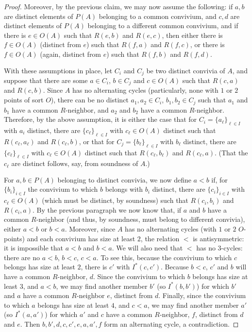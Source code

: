 \documentclass[10pt,a4paper]{amsart}
\begin{document}
\begin{proof}
Moreover, by the previous claim, we may now assume the following: if $a, b$ are distinct elements of $P(A)$ belonging to a common convivium, and $c, d$ are distinct elements of $P(A)$ belonging to a different common convivium, and if there is $e \in O(A) $ such that $R(e, b)$ and $R(e, c)$, then either there is $f \in O(A)$ (distinct from $e$) such that $R(f, a)$ and $R(f, c)$, or there is $f\in O(A)$ (again, distinct from $e$) such that $R(f, b)$ and $R(f, d)$.

With these assumptions in place, let $C_i$ and $C_j$ be two distinct convivia of $A$, and suppose that there are some $a \in C_i$, $b \in C_j$ and  $c \in O(A)$ such that $R(c, a)$ and $R(c, b)$.  Since $A$ has no alternating cycles (particularly, none with $1$ or $2$ points of sort $O$), there can be no distinct $a_1, a_2 \in C_i$, $b_1, b_2 \in C_j$ such that $a_1$ and $b_1$ have a common $R$-neighbor, and $a_2$ and $b_2$ have a common $R$-neighbor. Therefore, by the above assumption, it is either the case that for $C_i=\{a_\ell\}_{\ell \in I}$ with $a_i$ distinct, there are $\{c_\ell\}_{\ell \in I}$ with $c_\ell \in O(A)$ distinct such that $R(c_\ell, a_\ell)$ and $R(c_\ell, b)$, or that for $C_j=\{b_\ell\}_{\ell \in I}$ with $b_\ell$ distinct, there are $\{c_\ell\}_{\ell \in I}$ with $c_\ell \in O(A)$ distinct such that $R(c_\ell, b_\ell)$ and $R(c_\ell, a)$. (That the $c_{\ell}$ are distinct follows, say, from soundness of $A$.)


For $a, b \in P(A)$ belonging to distinct convivia, we now define $a < b$ if, for $\{b_i\}_{i \in I}$ the convivium to which $b$ belongs with $b_i$ distinct, there are $\{c_i \}_{i \in I}$ with $c_\ell \in O(A)$ (which must be distinct, by soundness) such that $R(c_i, b_i)$ and $R(c_i, a)$.  By the previous paragraph we now know that, if $a$ and $b$ have a common $R$-neighbor (and thus, by soundness, must belong to different convivia), either $a < b$ or $b < a$. Moreover, since $A$ has no alternating cycles (with $1$ or $2$ $O$-points) and each convivium has size at least $2$, the relation $<$ is antisymmetric: it is impossible that $a < b$ and $b < a$. We will also need that $<$ has no $3$-cycles: there are no $a < b$, $b < c$, $c < a$. To see this, because the convivium to which $c$ belongs has size at least $2$, there is $c'$ with $I^{*}(c, c')$. Because $b < c$, $c'$ and $b$ will have a common $R$-neighbor, $d$. Since the convivium to which $b$ belongs has size at least $3$, and $a < b$, we may find another member $b'$ (so $I^{*}(b, b')$) for which $b'$ and $a$ have a common $R$-neighbor $e$, distinct from $d$. Finally, since the convivium to which $a$ belongs has size at least $4$, and $c < a$, we may find another member $a'$ (so $I^{*}(a, a')$) for which $a'$ and $c$ have a common $R$-neighbor, $f$, distinct from $d$ and $e$. Then $b, b', d, c, c', e, a, a', f$ form an alternating cycle, a contradiction.



\end{proof}
\end{document}
